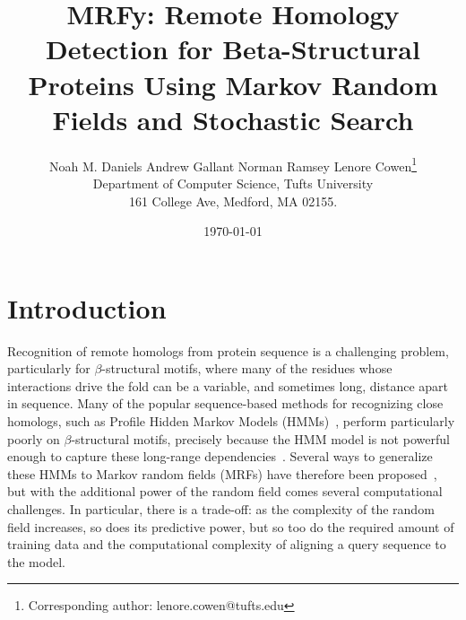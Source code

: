 \documentclass{acm_proc_article-sp}
\begin{document}
\title{MRFy: Remote Homology Detection for Beta-Structural Proteins
  Using Markov Random Fields and Stochastic Search}

\author{Noah M. Daniels \hspace*{8pt} Andrew Gallant \hspace*{8pt} Norman 
Ramsey \hspace*{8pt} 
Lenore Cowen\thanks{Corresponding author: lenore.cowen@tufts.edu}
\\ Department of Computer Science, Tufts University \\ 161 College Ave, 
Medford, MA 02155.}

\date{\today}

\maketitle




\begin{abstract}


\end{abstract} 




\section{Introduction}

Recognition of remote homologs from protein sequence is a challenging
problem, particularly for $\beta$-structural motifs, where many of the
residues whose interactions drive the fold can be a variable, and sometimes
long, distance apart in sequence. 
Many of the popular
sequence-based methods for recognizing close homologs, such as Profile
Hidden Markov Models (HMMs)~\cite{blah,blah}, perform particularly poorly on
$\beta$-structural motifs, precisely because the HMM model is not
powerful enough to capture these long-range dependencies~\cite{blah}. 
Several ways
to generalize these HMMs to Markov random fields (MRFs) have therefore
been proposed~\cite{blah,blah,blah}, but with the additional power of the 
random field comes several computational challenges. 
In particular, there is a trade-off: as the complexity of the random field
increases, so does its predictive power, but so too do the required amount of 
training data and the computational complexity of aligning a query sequence
to the model.
\end{document}
